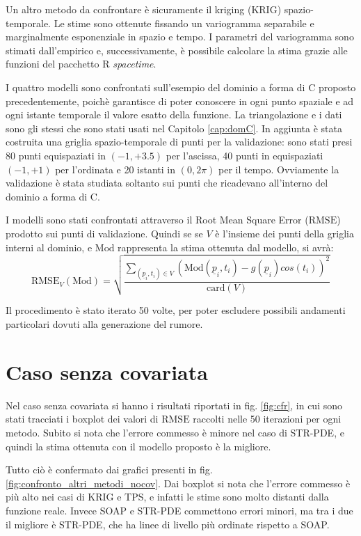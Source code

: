 \documentclass[a4paper,11pt,twoside,openright]{book}							%
\begin{document}
Un altro metodo da confrontare è sicuramente il kriging (KRIG) spazio-temporale. Le stime sono ottenute fissando un variogramma separabile e marginalmente esponenziale in spazio e tempo. I parametri del variogramma sono stimati dall'empirico e, successivamente, è possibile calcolare la stima grazie alle funzioni del pacchetto R \textit{spacetime}. 

I quattro modelli sono confrontati sull'esempio del dominio a forma di C proposto precedentemente, poichè garantisce di poter conoscere in ogni punto spaziale e ad ogni istante temporale il valore esatto della funzione. La triangolazione e i dati sono gli stessi che sono stati usati nel Capitolo \ref{cap:domC}. In aggiunta è stata costruita una griglia spazio-temporale di punti per la validazione: sono stati presi 80 punti equispaziati in $(-1,+3.5)$ per l'ascissa, 40 punti in equispaziati $(-1,+1)$ per l'ordinata e 20 istanti in $(0,2\pi)$ per il tempo. Ovviamente la validazione è stata studiata soltanto sui punti che ricadevano all'interno del dominio a forma di C.

I modelli sono stati confrontati attraverso il Root Mean Square Error ($\mathrm{RMSE}$) prodotto sui punti di validazione. Quindi se se $V$ è l'insieme dei punti della griglia interni al dominio, e $\mathrm{Mod}$ rappresenta la stima ottenuta dal modello, si avrà:
$$
\mathrm{RMSE}_V(\mathrm{Mod})=\sqrt{\frac{\sum_{(\underline p_i,t_i)\in V} (\mathrm{Mod}(\underline p_i,t_i)-g(\underline p_i)cos(t_i))^2}{\mathrm{card}(V)}}
$$ 

Il procedimento è stato iterato 50 volte, per poter escludere possibili andamenti particolari dovuti alla generazione del rumore.

\newpage
\section{Caso senza covariata}
Nel caso senza covariata si hanno i risultati riportati in fig. \ref{fig:cfr}, in cui sono stati tracciati i boxplot dei valori di $\mathrm{RMSE}$ raccolti nelle 50 iterazioni per ogni metodo. Subito si nota che l'errore commesso è minore nel caso di STR-PDE, e quindi la stima ottenuta con il modello proposto è la migliore.

Tutto ciò è confermato dai grafici presenti in fig. \ref{fig:confronto_altri_metodi_nocov}. Dai boxplot si nota che l'errore commesso è più alto nei casi di KRIG e TPS, e infatti le stime sono molto distanti dalla funzione reale. Invece SOAP e STR-PDE commettono errori minori, ma tra i due il migliore è STR-PDE, che ha linee di livello più ordinate rispetto a SOAP. 
\end{document}
